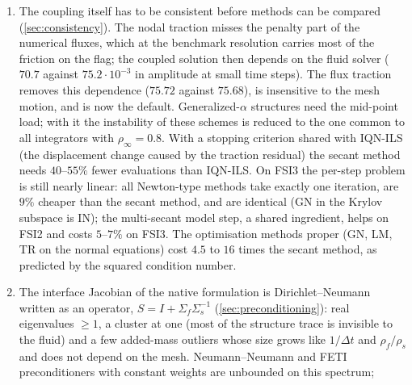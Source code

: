 \documentclass[11pt,a4paper]{article}
\theoremstyle{definition}
\theoremstyle{remark}
\begin{document}
\begin{enumerate}
therefore reach the cost of the secant method when they spend tangents only where the model fails:
model steps verified by the next state (and added to the model as exact pairs), tangents on demand
with an estimated success rate, difference quotients solved only to the accuracy a tangent needs,
and initial guesses of all fluid sub-steps predicted from the tangent responses. Since the tangent
map changes quickly on the limit cycle, the recycled pairs must be recent ($8$ instead of $16$ time
steps). On $[0,15]$ IN, GN, LM and TR then cost $1.00$--$1.01$ (dual splitting, previously $1.39$) and
$1.04$--$1.05$ (coupled, previously $1.09$) times the secant method, SD and L-BFGS with the same model
steps before their gradient $1.09$ (previously $1.24$), and on the limit cycle IN is faster than the
secant method with dual splitting.
\item The coupling itself has to be consistent before methods can be compared
(\cref{sec:consistency}). The nodal traction misses the penalty part of the numerical fluxes, which
at the benchmark resolution carries most of the friction on the flag; the coupled solution then
depends on the fluid solver ($70.7$ against $75.2\cdot10^{-3}$ in amplitude at small time steps).
The flux traction removes this dependence ($75.72$ against $75.68$), is insensitive to the mesh
motion, and is now the default.
Generalized-$\alpha$ structures need the mid-point load; with it the instability of these schemes
is reduced to the one common to all integrators with $\rho_\infty=0.8$. With a stopping criterion
shared with IQN-ILS (the displacement change caused by the traction residual) the secant method
needs $40$--$55\%$ fewer evaluations than IQN-ILS. On FSI3 the per-step problem is still nearly
linear: all Newton-type methods take exactly one iteration, are $9\%$ cheaper than the secant
method, and are identical (GN in the Krylov subspace is IN); the multi-secant model step, a shared
ingredient, helps on FSI2 and costs $5$--$7\%$ on FSI3. The optimisation methods proper (GN, LM,
TR on the normal equations) cost $4.5$ to $16$ times the secant method, as predicted by the squared
condition number.
\item The interface Jacobian of the native formulation is Dirichlet--Neumann written as an
operator, $S=I+\Sigma_f\Sigma_s^{-1}$ (\cref{sec:preconditioning}): real eigenvalues $\ge1$, a
cluster at one (most of the structure trace is invisible to the fluid) and a few added-mass
outliers whose size grows like $1/\Delta t$ and $\rho_f/\rho_s$ and does not depend on the mesh.
Neumann--Neumann and FETI preconditioners with constant weights are unbounded on this spectrum;

\end{enumerate}
\end{document}
